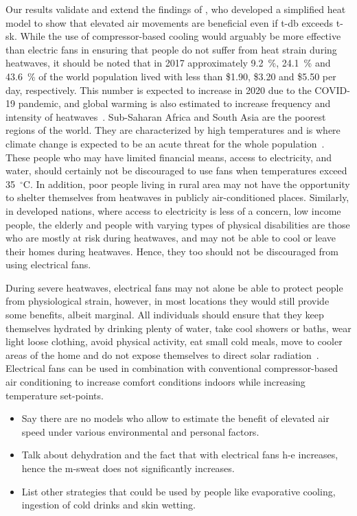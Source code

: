 Our results validate and extend the findings of , who developed a simplified heat model to show that elevated air movements are beneficial even if \ac{t-db} exceeds \acf{t-sk}.
While the use of compressor-based cooling would arguably be more effective than electric fans in ensuring that people do not suffer from heat strain during heatwaves, it should be noted that in 2017 approximately 9.2~\%, 24.1~\% and 43.6~\% of the world population lived with less than \$1.90, \$3.20 and \$5.50 per day, respectively.
This number is expected to increase in 2020 due to the COVID-19 pandemic, and global warming is also estimated to increase frequency and intensity of heatwaves~\cite{PovertyO1:online}.
Sub-Saharan Africa and South Asia are the poorest regions of the world.
They are characterized by high temperatures and is where climate change is expected to be an acute threat for the whole population~\cite{PovertyO1:online}.
These people who may have limited financial means, access to electricity, and water, should certainly not be discouraged to use fans when temperatures exceed 35~$^{\circ}$C\@.
In addition, poor people living in rural area may not have the opportunity to shelter themselves from heatwaves in publicly air-conditioned places.
Similarly, in developed nations, where access to electricity is less of a concern, low income people, the elderly and people with varying types of physical disabilities are those who are mostly at risk during heatwaves, and may not be able to cool or leave their homes during heatwaves.
Hence, they too should not be discouraged from using electrical fans.

During severe heatwaves, electrical fans may not alone be able to protect people from physiological strain, however, in most locations they would still provide some benefits, albeit marginal.
All individuals should ensure that they keep themselves hydrated by drinking plenty of water, take cool showers or baths, wear light loose clothing, avoid physical activity, eat small cold meals, move to cooler areas of the home and do not expose themselves to direct solar radiation~\cite{HeatandH28:online}.
Electrical fans can be used in combination with conventional compressor-based air conditioning to increase comfort conditions indoors while increasing temperature set-points.

\begin{itemize}
    \item Say there are no models who allow to estimate the benefit of elevated air speed under various environmental and personal factors.
    \item Talk about dehydration and the fact that with electrical fans \ac{h-e} increases, hence the \ac{m-sweat} does not significantly increases. %
    \item List other strategies that could be used by people like evaporative cooling, ingestion of cold drinks and skin wetting.
\end{itemize}

